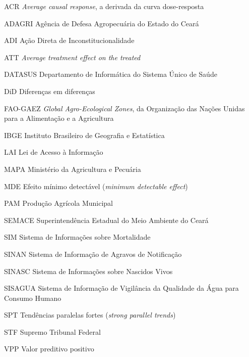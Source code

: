 \documentclass[12pt,oneside,a4paper,chapter=TITLE,english,brazil]{abntex2}
\renewcommand{\imprimircapa}{%
  \begin{capa}%
    \center
    {\large\imprimirinstituicao}
    \vfill
    {\large\imprimirautor}
    \vfill
    \begin{center}
      \ABNTEXchapterfont\bfseries\LARGE\imprimirtitulo
    \end{center}
    \vfill
    {\large\imprimirlocal}\par
    {\large\imprimirdata}
    \vspace*{1cm}
  \end{capa}}
\begin{document}
\frenchspacing

\imprimircapa
\imprimirfolhaderosto

\begin{siglas}
  \item[ACR] \emph{Average causal response}, a derivada da curva dose-resposta
  \item[ADAGRI] Agência de Defesa Agropecuária do Estado do Ceará
  \item[ADI] Ação Direta de Inconstitucionalidade
  \item[ATT] \emph{Average treatment effect on the treated}
  \item[DATASUS] Departamento de Informática do Sistema Único de Saúde
  \item[DiD] Diferenças em diferenças
  \item[FAO-GAEZ] \emph{Global Agro-Ecological Zones}, da Organização das Nações
    Unidas para a Alimentação e a Agricultura
  \item[IBGE] Instituto Brasileiro de Geografia e Estatística
  \item[LAI] Lei de Acesso à Informação
  \item[MAPA] Ministério da Agricultura e Pecuária
  \item[MDE] Efeito mínimo detectável (\emph{minimum detectable effect})
  \item[PAM] Produção Agrícola Municipal
  \item[SEMACE] Superintendência Estadual do Meio Ambiente do Ceará
  \item[SIM] Sistema de Informações sobre Mortalidade
  \item[SINAN] Sistema de Informação de Agravos de Notificação
  \item[SINASC] Sistema de Informações sobre Nascidos Vivos
  \item[SISAGUA] Sistema de Informação de Vigilância da Qualidade da Água para
    Consumo Humano
  \item[SPT] Tendências paralelas fortes (\emph{strong parallel trends})
  \item[STF] Supremo Tribunal Federal
  \item[VPP] Valor preditivo positivo
\end{siglas}

\tableofcontents*
\cleardoublepage
\end{document}
